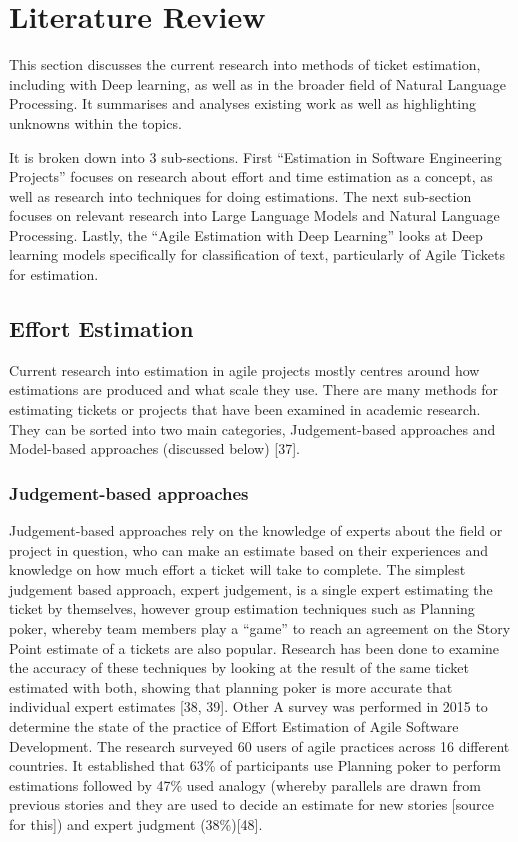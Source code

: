 \documentclass{UoYCSproject}
\begin{document}
\chapter{Literature Review}
\label{ch:literature-review}
This section discusses the current research into methods of ticket estimation, including with Deep learning, as well as in the broader field of Natural Language Processing.
It summarises and analyses existing work as well as highlighting unknowns within the topics.

It is broken down into 3 sub-sections.
First “Estimation in Software Engineering Projects” focuses on research about effort and time estimation as a concept, as well as research into techniques for doing estimations.
The next sub-section focuses on relevant research into Large Language Models and Natural Language Processing.
Lastly, the “Agile Estimation with Deep Learning” looks at Deep learning models specifically for classification of text, particularly of Agile Tickets for estimation.

\section[Effort Estimation]{Effort Estimation}
\label{sec:effort-estimation}
Current research into estimation in agile projects mostly centres around how estimations are produced and what scale they use.
There are many methods for estimating tickets or projects that have been examined in academic research.
They can be sorted into two main categories, Judgement-based approaches and Model-based approaches (discussed below) [37].
\subsection{Judgement-based approaches}
\label{subsec:judgement-based-approaches}

Judgement-based approaches rely on the knowledge of experts about the field or project in question, who can make an estimate based on their experiences and knowledge on how much effort a ticket will take to complete.
The simplest judgement based approach, expert judgement, is a single expert estimating the ticket by themselves, however group estimation techniques such as Planning poker, whereby team members play a “game” to reach an agreement on the Story Point estimate of a tickets are also popular.
Research has been done to examine the accuracy of these techniques by looking at the result of the same ticket estimated with both, showing that planning poker is more accurate that individual expert estimates [38, 39]. Other
A survey was performed in 2015 to determine the state of the practice of Effort Estimation of Agile Software Development.
The research surveyed 60 users of agile practices across 16 different countries. It established that 63\% of participants use Planning poker to perform estimations followed by 47\% used analogy (whereby parallels are drawn from previous stories and they are used to decide an estimate for new stories [source for this]) and expert judgment (38\%)[48].
\end{document}
